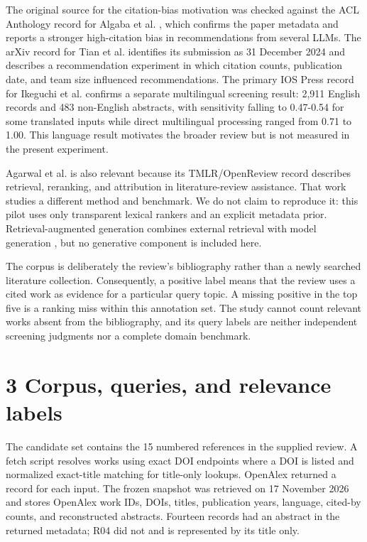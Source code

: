 \documentclass[acmsmall,nonacm]{acmart}
\begin{document}
The original source for the citation-bias motivation was checked against the ACL Anthology record for Algaba et al. \cite{algaba2025citation}, which confirms the paper metadata and reports a stronger high-citation bias in recommendations from several LLMs. The arXiv record for Tian et al. \cite{tian2024recommendation} identifies its submission as 31 December 2024 and describes a recommendation experiment in which citation counts, publication date, and team size influenced recommendations. The primary IOS Press record for Ikeguchi et al. \cite{ikeguchi2026language} confirms a separate multilingual screening result: 2,911 English records and 483 non-English abstracts, with sensitivity falling to 0.47-0.54 for some translated inputs while direct multilingual processing ranged from 0.71 to 1.00. This language result motivates the broader review but is not measured in the present experiment.\par

Agarwal et al. \cite{agarwal2025litllms} is also relevant because its TMLR/OpenReview record describes retrieval, reranking, and attribution in literature-review assistance. That work studies a different method and benchmark. We do not claim to reproduce it: this pilot uses only transparent lexical rankers and an explicit metadata prior. Retrieval-augmented generation combines external retrieval with model generation \cite{lewis2020rag}, but no generative component is included here.\par

The corpus is deliberately the review's bibliography rather than a newly searched literature collection. Consequently, a positive label means that the review uses a cited work as evidence for a particular query topic. A missing positive in the top five is a ranking miss within this annotation set. The study cannot count relevant works absent from the bibliography, and its query labels are neither independent screening judgments nor a complete domain benchmark.\par

\section*{3 Corpus, queries, and relevance labels}

The candidate set contains the 15 numbered references in the supplied review. A fetch script resolves works using exact DOI endpoints where a DOI is listed and normalized exact-title matching for title-only lookups. OpenAlex returned a record for each input. The frozen snapshot was retrieved on 17 November 2026 and stores OpenAlex work IDs, DOIs, titles, publication years, language, cited-by counts, and reconstructed abstracts. Fourteen records had an abstract in the returned metadata; R04 did not and is represented by its title only.\par
\end{document}

